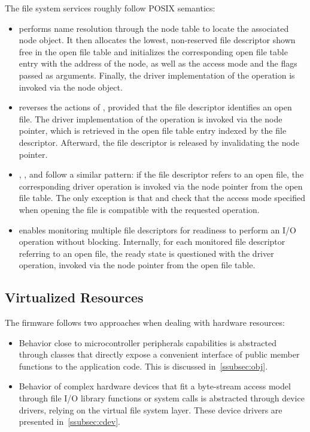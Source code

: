 \begin{description}
    The file system services roughly follow POSIX semantics:
    \begin{itemize}
        \item {} performs name resolution through the node table to locate the associated node object. It then allocates the lowest, non-reserved file descriptor shown free in the open file table and initializes the corresponding open file table entry with the address of the node, as well as the access mode and the flags passed as arguments. Finally, the driver implementation of the operation is invoked via the node object.

        \item {} reverses the actions of , provided that the file descriptor identifies an open file. The driver implementation of the operation is invoked via the node pointer, which is retrieved in the open file table entry indexed by the file descriptor. Afterward, the file descriptor is released by invalidating the node pointer.

        \item {}, , and  follow a similar pattern: if the file descriptor refers to an open file, the corresponding driver operation is invoked via the node pointer from the open file table.
        The only exception is that  and  check that the access mode specified when opening the file is compatible with the requested operation.

        \item {} enables monitoring multiple file descriptors for readiness to perform an I/O operation without blocking.
        Internally, for each monitored file descriptor referring to an open file, the ready state is questioned with the driver  operation, invoked via the node pointer from the open file table.
    \end{itemize}
\end{description}

\subsection{Virtualized Resources}\label{subsec:vdev}

The firmware follows two approaches when dealing with hardware resources:
\begin{itemize}
    \item Behavior close to microcontroller peripherals capabilities is abstracted through \cpp classes that directly expose a convenient interface of public member functions to the application code. This is discussed in~\cref{ssubsec:obj}.
    \item Behavior of complex hardware devices that fit a byte-stream access model through file I/O library functions or system calls is abstracted through device drivers, relying on the virtual file system layer. These device drivers are presented in~\cref{ssubsec:cdev}.
\end{itemize}

